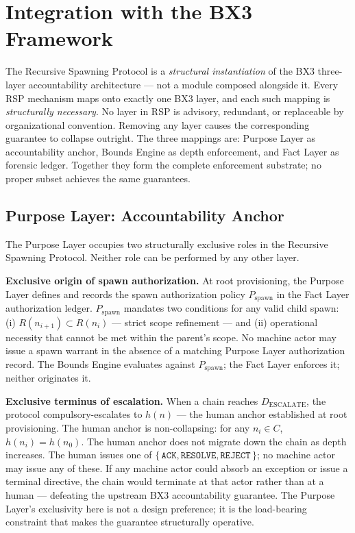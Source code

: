 \section{Integration with the BX3 Framework}
\label{sec:rs-integration}

The Recursive Spawning Protocol is a \emph{structural instantiation} of the BX3 three-layer accountability architecture — not a module composed alongside it. Every RSP mechanism maps onto exactly one BX3 layer, and each such mapping is \emph{structurally necessary}. No layer in RSP is advisory, redundant, or replaceable by organizational convention. Removing any layer causes the corresponding guarantee to collapse outright. The three mappings are: Purpose Layer as accountability anchor, Bounds Engine as depth enforcement, and Fact Layer as forensic ledger. Together they form the complete enforcement substrate; no proper subset achieves the same guarantees.

\subsection{Purpose Layer: Accountability Anchor}
\label{sec:rs-purpose-anchor}

The Purpose Layer occupies two structurally exclusive roles in the Recursive Spawning Protocol. Neither role can be performed by any other layer.

\medskip
\noindent\textbf{Exclusive origin of spawn authorization.} At root provisioning, the Purpose Layer defines and records the spawn authorization policy $P_{\mathrm{spawn}}$ in the Fact Layer authorization ledger. $P_{\mathrm{spawn}}$ mandates two conditions for any valid child spawn: (i) $R(n_{i+1}) \subset R(n_i)$ — strict scope refinement — and (ii) operational necessity that cannot be met within the parent's scope. No machine actor may issue a spawn warrant in the absence of a matching Purpose Layer authorization record. The Bounds Engine evaluates against $P_{\mathrm{spawn}}$; the Fact Layer enforces it; neither originates it.

\medskip
\noindent\textbf{Exclusive terminus of escalation.} When a chain reaches $D_{\mathrm{ESCALATE}}$, the protocol compulsory-escalates to $h(n)$ — the human anchor established at root provisioning. The human anchor is non-collapsing: for any $n_i \in C$, $h(n_i) = h(n_0)$. The human anchor does not migrate down the chain as depth increases. The human issues one of $\{\,\texttt{ACK}, \texttt{RESOLVE}, \texttt{REJECT}\,\}$; no machine actor may issue any of these. If any machine actor could absorb an exception or issue a terminal directive, the chain would terminate at that actor rather than at a human — defeating the upstream BX3 accountability guarantee. The Purpose Layer's exclusivity here is not a design preference; it is the load-bearing constraint that makes the guarantee structurally operative.

